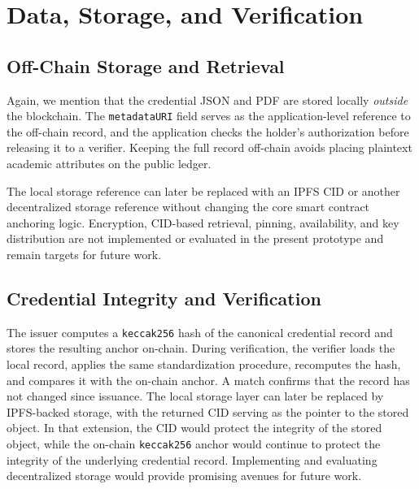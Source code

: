 \documentclass[conference]{IEEEtran}
\begin{document}
\section{Data, Storage, and Verification}
\subsection{Off-Chain Storage and Retrieval}
Again, we mention that the credential JSON and PDF are stored locally \emph{outside} the blockchain. The \verb|metadataURI| field serves as the application-level reference to the off-chain record, and the application checks the holder's authorization before releasing it to a verifier. Keeping the full record off-chain avoids placing plaintext academic attributes on the public ledger.

The local storage reference can later be replaced with an IPFS CID or another decentralized storage reference without changing the core smart contract anchoring logic. Encryption, CID-based retrieval, pinning, availability, and key distribution are not implemented or evaluated in the present prototype and remain targets for future work.

\subsection{Credential Integrity and Verification}
The issuer computes a \verb|keccak256| hash of the canonical credential record and stores the resulting anchor on-chain. During verification, the verifier loads the local record, applies the same standardization procedure, recomputes the hash, and compares it with the on-chain anchor. A match confirms that the record has not changed since issuance.
The local storage layer can later be replaced by IPFS-backed storage, with the returned CID serving as the pointer to the stored object. In that extension, the CID would protect the integrity of the stored object, while the on-chain \verb|keccak256| anchor would continue to protect the integrity of the underlying credential record. Implementing and evaluating decentralized storage would provide promising avenues for future work.
\end{document}
